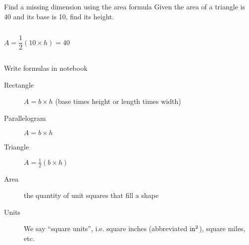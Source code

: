 \begin{frame}{Find a missing dimension using the area formula}
    Given the area of a triangle is 40 and its base is 10, find its height. \vspace{1cm}
    \begin{columns}
        $$A =  \frac{1}{2} (10 \times h) = 40$$
    \end{columns} \vspace{1.5cm}
    \end{frame}

\begin{frame}{Write formulas in notebook}
        \begin{description}
            \item[Rectangle] $A=b \times h$ (base times height or length times width)
            \item[Parallelogram] $A=b \times h$
            \item[Triangle] $A=\frac{1}{2} (b \times h)$ \vspace{0.5cm}
            \item[Area] the quantity of unit squares that fill a shape
            \item[Units] We say ``square units'', i.e. square inches (abbreviated $\rm{in}^2$), square miles, etc.
        \end{description}
    \end{frame}
    

